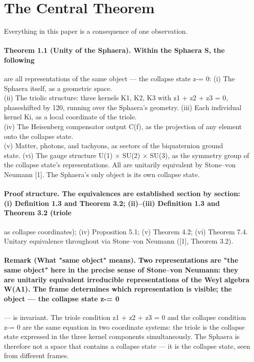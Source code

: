\section{The Central Theorem}
Everything in this paper is a consequence of one observation.
\paragraph*{Theorem 1.1 (Unity of the Sphaera). Within the Sphaera S, the following}
are all representations of the same object --- the collapse state z-= 0:
(i) The Sphaera itself, as a geometric space.\\
(ii) The triolic structure: three kernels K1, K2, K3 with z1 + z2 + z3 = 0,\\
phaseshifted by 120, running over the Sphaera's geometry.
(iii) Each individual kernel Ki, as a local coordinate of the triole.\\
(iv) The Heisenberg compensator output C(f), as the projection of any element onto the collapse state.\\
(v) Matter, photons, and tachyons, as sectors of the biquaternion ground\\
state.
(vi) The gauge structure U(1) $\times$ SU(2) $\times$ SU(3), as the symmetry group of\\
the collapse state's representations. All are unitarily equivalent by Stone--von Neumann [1]. The Sphaera's only object is its own collapse state.
\paragraph*{Proof structure. The equivalences are established section by section: (i) Definition 1.3 and Theorem 3.2; (ii)--(iii) Definition 1.3 and Theorem 3.2 (triole}
as collapse coordinates); (iv) Proposition 5.1; (v) Theorem 4.2; (vi) Theorem 7.4. Unitary equivalence throughout via Stone--von Neumann ([1], Theorem 3.2).
\paragraph*{Remark (What "same object" means). Two representations are "the same object" here in the precise sense of Stone--von Neumann: they are unitarily equivalent irreducible representations of the Weyl algebra W(A1). The frame determines which representation is visible; the object --- the collapse state z-= 0}
--- is invariant. The triole condition z1 + z2 + z3 = 0 and the collapse condition z-= 0 are the same equation in two coordinate systems: the triole is the collapse state expressed in the three kernel components simultaneously. The Sphaera is therefore not a space that contains a collapse state --- it is the collapse state, seen from different frames.
